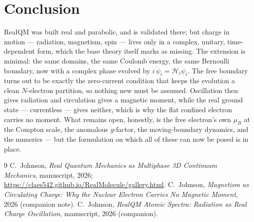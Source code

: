 \documentclass[11pt]{article}
\begin{document}
\section{Conclusion}
\label{sec:concl}

RealQM was built real and parabolic, and is validated there; but charge in motion --- radiation,
magnetism, spin --- lives only in a complex, unitary, time-dependent form, which the base theory itself
marks as missing. The extension is minimal: the same domains, the same Coulomb energy, the same Bernoulli
boundary, now with a complex phase evolved by $i\,\dot\psi_i=\mathcal H_i\psi_i$. The free boundary
turns out to be exactly the zero-current condition that keeps the evolution a clean $N$-electron
partition, so nothing new must be assumed. Oscillation then gives radiation and circulation gives a
magnetic moment, while the real ground state --- currentless --- gives neither, which is why the flat
confined electron carries no moment. What remains open, honestly, is the free electron's own $\mu_B$ at
the Compton scale, the anomalous $g$-factor, the moving-boundary dynamics, and the numerics --- but the
formulation on which all of these can now be posed is in place.

\begin{thebibliography}{9}
 C.~Johnson, \emph{Real Quantum Mechanics as Multiphase 3D Continuum Mechanics},
manuscript, 2026; \url{https://claes542.github.io/RealMolecule/gallery.html}.
 C.~Johnson, \emph{Magnetism as Circulating Charge: Why the Nuclear Electron
Carries No Magnetic Moment}, 2026 (companion note).
 C.~Johnson, \emph{RealQM Atomic Spectra: Radiation as Real Charge Oscillation},
manuscript, 2026 (companion).
\end{thebibliography}
\end{document}
